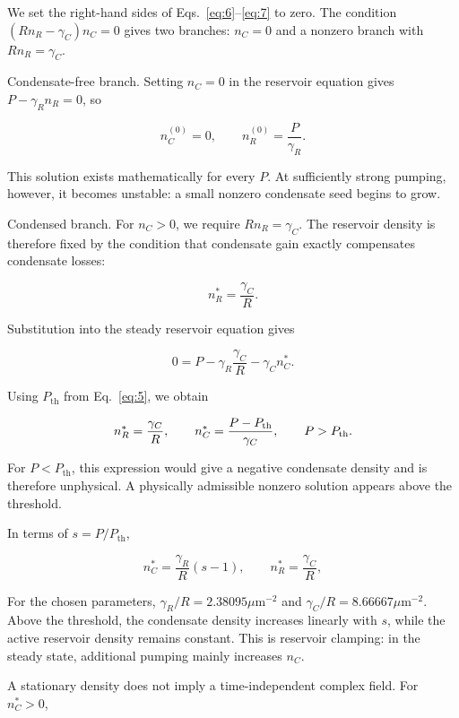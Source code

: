 \documentclass[12pt,a4paper]{article}
\begin{document}
We set the right-hand sides of Eqs.~\eqref{eq:6}--\eqref{eq:7} to zero. The condition $(R n_{R}-\gamma_{C})n_{C}=0$ gives two branches: $n_{C}=0$ and a nonzero branch with $R n_{R}=\gamma_{C}$.

Condensate-free branch. Setting $n_{C}=0$ in the reservoir equation gives $P-\gamma_{R} n_{R}=0$, so

\begin{equation}\label{eq:8}
n_C^{(0)}=0,\qquad n_R^{(0)}=\frac{P}{\gamma_R}.\end{equation}

This solution exists mathematically for every $P$. At sufficiently strong pumping, however, it becomes unstable: a small nonzero condensate seed begins to grow.

Condensed branch. For $n_{C}>0$, we require $R n_{R}=\gamma_{C}$. The reservoir density is therefore fixed by the condition that condensate gain exactly compensates condensate losses:

\[
n_R^*=\frac{\gamma_C}{R}.
\]

Substitution into the steady reservoir equation gives

\[
0=P-\gamma_R\frac{\gamma_C}{R}-\gamma_C n_C^*.
\]

Using $P_{\mathrm{th}}$ from Eq.~\eqref{eq:5}, we obtain

\begin{equation}\label{eq:9}
n_R^*=\frac{\gamma_C}{R},\qquad n_C^*=\frac{P-P_{\rm th}}{\gamma_C},\qquad P>P_{\rm th}.\end{equation}

For $P<P_{\mathrm{th}}$, this expression would give a negative condensate density and is therefore unphysical. A physically admissible nonzero solution appears above the threshold.

In terms of $s=P/P_{\mathrm{th}}$,

\begin{equation}\label{eq:10}
n_C^*=\frac{\gamma_R}{R}(s-1),\qquad n_R^*=\frac{\gamma_C}{R},\end{equation}

For the chosen parameters, $\gamma_{R}/R=2.38095 \mu\mathrm m^{-2}$ and $\gamma_{C}/R=8.66667 \mu\mathrm m^{-2}$. Above the threshold, the condensate density increases linearly with $s$, while the active reservoir density remains constant. This is reservoir clamping: in the steady state, additional pumping mainly increases $n_{C}$.

A stationary density does not imply a time-independent complex field. For $n_{C}^{*}>0$,
\end{document}
